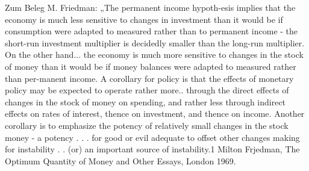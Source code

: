 Zum Beleg M. Friedman: „The permanent income hypoth-esis implies that the economy is much less sensitive to changes in investment than it would be if consumption were adapted to measured rather than to permanent income - the short-run investment multiplier is decidedly smaller than the long-run multiplier. On the other hand... the economy is much more sensitive to changes in the stock of money than it would be if money balances were adapted to measured rather than per-manent income. A corollary for policy is that the effects of monetary policy may be expected to operate rather more.. through the direct effects of changes in the stock of money on 
spending, and rather less through indirect effects on rates of interest, thence on investment, and thence on income. Another corollary is to emphasize the potency of relatively small changes in the stock money - a potency . . . for good or evil adequate to offset other changes making for instability . . (or) an important source of instability.1
Milton Frjedman, The Optimum Quantity of Money and Other Essays, London 1969.




















